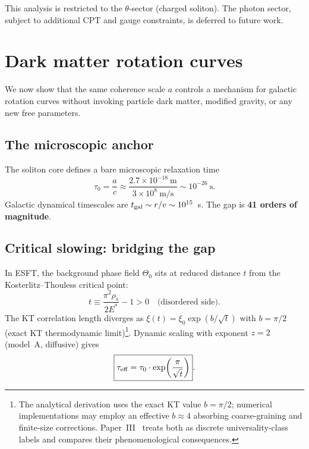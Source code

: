 ﻿\documentclass[a4paper,12pt]{article}
\begin{document}
This analysis is restricted to the $\theta$-sector (charged soliton).
The photon sector, subject to additional CPT and gauge constraints, is
deferred to future work.

\section{Dark matter rotation curves}
\label{sec:dm}

We now show that the same coherence scale $a$ controls a mechanism for
galactic rotation curves without invoking particle dark matter, modified
gravity, or any new free parameters.

\subsection{The microscopic anchor}

The soliton core defines a bare microscopic relaxation time
\begin{equation}
  \tau_0 = \frac{a}{c}
    \approx \frac{2.7\times 10^{-18}~\text{m}}{3\times 10^8~\text{m/s}}
    \sim 10^{-26}~\text{s}.
  \label{eq:tau0}
\end{equation}
Galactic dynamical timescales are $t_{\rm gal}\sim r/v\sim 10^{15}$~s.
The gap is \textbf{41 orders of magnitude}.

\subsection{Critical slowing: bridging the gap}
\label{sec:critical}

In ESFT, the background phase field $\Theta_0$ sits at reduced distance
$t$ from the Kosterlitz--Thouless critical point:
\begin{equation}
  t \equiv \frac{\pi^2\rho_s}{2E^*} - 1 > 0\quad
    \text{(disordered side)}.
\end{equation}
The KT correlation length diverges as
$\xi(t)=\xi_0\exp(b/\sqrt{t})$ with $b=\pi/2$ (exact KT thermodynamic limit)\footnote{The analytical derivation uses the exact KT value $b=\pi/2$; numerical implementations may employ an effective $b\approx 4$ absorbing coarse-graining and finite-size corrections.  Paper~III~\cite{PaperIII} treats both as discrete universality-class labels and compares their phenomenological consequences.}.  Dynamic
scaling with exponent $z=2$ (model~A, diffusive) gives
\begin{equation}
  \boxed{\tau_{\rm eff} = \tau_0\cdot\exp\!\left(\frac{\pi}{\sqrt{t}}\right)}.
  \label{eq:taueff}
\end{equation}
\end{document}
